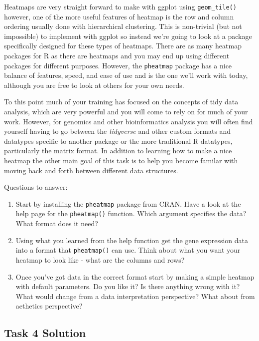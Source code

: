 \documentclass[
]{book}
\providecommand{\tightlist}{%
  \setlength{\itemsep}{0pt}\setlength{\parskip}{0pt}}
\begin{document}
Heatmaps are very straight forward to make with ggplot using \texttt{geom\_tile()} however, one of the more useful features of heatmap is the row and column ordering usually done with hierarchical clustering. This is non-trivial (but not impossible) to implement with ggplot so instead we're going to look at a package specifically designed for these types of heatmaps. There are as many heatmap packages for R as there are heatmaps and you may end up using different packages for different purposes. However, the \texttt{pheatmap} package has a nice balance of features, speed, and ease of use and is the one we'll work with today, although you are free to look at others for your own needs.

To this point much of your training has focused on the concepts of tidy data analysis, which are very powerful and you will come to rely on for much of your work. However, for genomics and other bioinformatics analysis you will often find yourself having to go between the \emph{tidyverse} and other custom formats and datatypes specific to another package or the more traditional R datatypes, particularly the matrix format. In addition to learning how to make a nice heatmap the other main goal of this task is to help you become familar with moving back and forth between different data structures.

Questions to answer:

\begin{enumerate}
\def\labelenumi{\arabic{enumi}.}
\tightlist
\item
  Start by installing the \texttt{pheatmap} package from CRAN. Have a look at the help page for the \texttt{pheatmap()} function. Which argument specifies the data? What format does it need?
\item
  Using what you learned from the help function get the gene expression data into a format that \texttt{pheatmap()} can use. Think about what you want your heatmap to look like - what are the columns and rows?
\item
  Once you've got data in the correct format start by making a simple heatmap with default parameters. Do you like it? Is there anything wrong with it? What would change from a data interpretation perspective? What about from aethetics perspective?
\end{enumerate}

\hypertarget{task-4-solution}{%
\subsection*{Task 4 Solution}\label{task-4-solution}}
\end{document}
